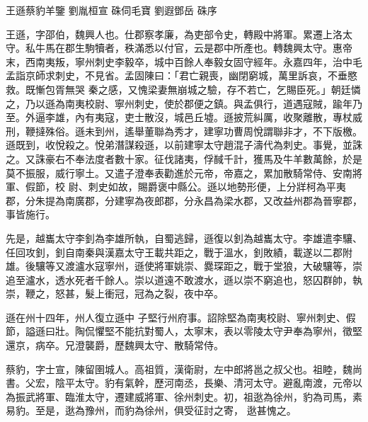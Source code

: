 
\begin{pinyinscope}
王遜蔡豹羊鑒
 劉胤桓宣
 硃伺毛寶
 劉遐鄧岳
 硃序



 王遜，字邵伯，魏興人也。仕郡察孝廉，為吏部令史，轉殿中將軍。累遷上洛太守。私牛馬在郡生駒犢者，秩滿悉以付官，云是郡中所產也。轉魏興太守。惠帝末，西南夷叛，寧州刺史李毅卒，城中百餘人奉毅女固守經年。永嘉四年，治中毛孟詣京師求刺史，不見省。孟固陳曰：「君亡親喪，幽閉窮城，萬里訴哀，不垂愍救。既慚包胥無哭
 秦之感，又愧梁妻無崩城之驗，存不若亡，乞賜臣死。」朝廷憐之，乃以遜為南夷校尉、寧州刺史，使於郡便之鎮。與孟俱行，道遇寇賊，踰年乃至。外逼李雄，內有夷寇，吏士散沒，城邑丘墟。遜披荒糾厲，收聚離散，專杖威刑，鞭撻殊俗。遜未到州，遙舉董聯為秀才，建寧功曹周悅謂聯非才，不下版檄。遜既到，收悅殺之。悅弟潛謀殺遜，以前建寧太守趙混子濤代為刺史。事覺，並誅之。又誅豪右不奉法度者數十家。征伐諸夷，俘馘千計，獲馬及牛羊數萬餘，於是莫不振服，威行寧土。又遣子澄奉表勸進於元帝，帝嘉之，累加散騎常侍、安南將軍、假節，校
 尉、刺史如故，賜爵褒中縣公。遜以地勢形便，上分牂柯為平夷郡，分朱提為南廣郡，分建寧為夜郎郡，分永昌為梁水郡，又改益州郡為晉寧郡，事皆施行。



 先是，越巂太守李釗為李雄所執，自蜀逃歸，遜復以釗為越巂太守。李雄遣李驤、任回攻釗，釗自南秦與漢嘉太守王載共距之，戰于溫水，釗敗績，載遂以二郡附雄。後驤等又渡瀘水寇寧州，遜使將軍姚崇、爨琛距之，戰于堂狼，大破驤等，崇追至瀘水，透水死者千餘人。崇以道遠不敢渡水，遜以崇不窮追也，怒囚群帥，執崇，鞭之，怒甚，髮上衝冠，冠為之裂，夜中卒。



 遜在州十四年，州人復立遜中
 子堅行州府事。詔除堅為南夷校尉、寧州刺史、假節，謚遜曰壯。陶侃懼堅不能抗對蜀人，太寧末，表以零陵太守尹奉為寧州，徵堅還京，病卒。兄澄襲爵，歷魏興太守、散騎常侍。



 蔡豹，字士宣，陳留圉城人。高祖質，漢衛尉，左中郎將邕之叔父也。祖睦，魏尚書。父宏，陰平太守。豹有氣幹，歷河南丞，長樂、清河太守。避亂南渡，元帝以為振武將軍、臨淮太守，遷建威將軍、徐州刺史。初，祖逖為徐州，豹為司馬，素易豹。至是，逖為豫州，而豹為徐州，俱受征討之寄，
 逖甚愧之。




\end{pinyinscope}
